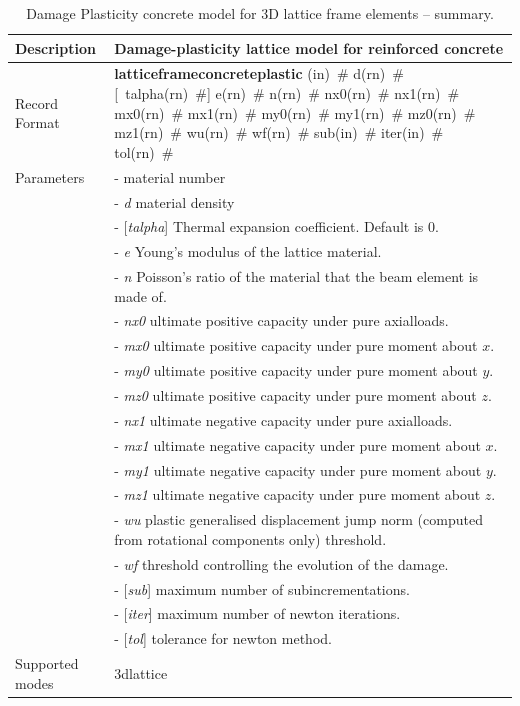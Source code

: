 \documentclass[a4paper]{article}
\newcommand{\descitem}[1]{{\noindent \bf #1}}
\newcommand{\elemparam}[2]{{{#1\tiny (#2)}~\#}}
\newcommand{\optelemparam}[2]{[{~\elemparam{#1}{#2}}]}
\newcommand{\param}[1]{{\it #1}}
\newcommand{\optparam}[1]{[{\it #1}]}
\newenvironment{mmt}{\begin{tabular}{|l|p{9cm}|}}{\end{tabular}\\}
\newenvironment{mmt}{\begin{tabular}{|l|l|}}{\end{tabular}\\}
\begin{document}
\begin{table}[!htb]
\begin{mmt}
\hline
Description & Damage-plasticity lattice model for reinforced concrete\\
\hline
Record Format & \descitem{latticeframeconcreteplastic} \elemparam{}{in}
\elemparam{d}{rn} \optelemparam{talpha}{rn} \elemparam{e}{rn} \elemparam{n}{rn} \elemparam{nx0}{rn} \elemparam{nx1}{rn} \elemparam{mx0}{rn} \elemparam{mx1}{rn} \elemparam{my0}{rn} \elemparam{my1}{rn} \elemparam{mz0}{rn} \elemparam{mz1}{rn} \elemparam{wu}{rn}  \elemparam{wf}{rn} \elemparam{sub}{in} \elemparam{iter}{in} \elemparam{tol}{rn}\\
Parameters &- \param{} material number\\
&- \param{d} material density\\
&- \optparam{talpha} Thermal expansion coefficient. Default is 0.\\
&- \param{e} Young's modulus of the lattice material.\\
&- \param{n} Poisson's ratio of the material that the beam element is made of.\\
&- \param{nx0} ultimate positive capacity under pure axialloads.\\
&- \param{mx0} ultimate positive capacity under pure moment about $x$.\\
&- \param{my0} ultimate positive capacity under pure moment about $y$.\\
&- \param{mz0} ultimate positive capacity under pure moment about $z$.\\
&- \param{nx1} ultimate negative capacity under pure axialloads.\\
&- \param{mx1} ultimate negative capacity under pure moment about $x$.\\
&- \param{my1} ultimate negative capacity under pure moment about $y$.\\
&- \param{mz1} ultimate negative capacity under pure moment about $z$.\\
&- \param{wu} plastic generalised displacement jump norm (computed from rotational components only) threshold.\\
&- \param{wf} threshold controlling the evolution of the damage.\\
&- \optparam{sub} maximum number of subincrementations.\\
&- \optparam{iter} maximum number of newton iterations.\\
&- \optparam{tol} tolerance for newton method.\\
Supported modes & 3dlattice\\
\hline
\end{mmt}
\caption{Damage Plasticity concrete model for 3D lattice frame elements -- summary.}
\label{latticeframesteelplastic_table}
\end{table}
\end{document}
